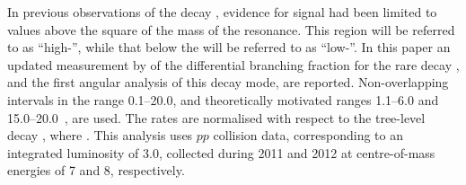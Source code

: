 In previous observations of the decay \decay{\Lb}{\Lz\mumu}
\cite{Aaltonen:2011qs,LHCB-PAPER-2013-025}, evidence for signal had
been limited to \qsq values above the square of the mass of the
\psitwos resonance. This region will be referred to as ``high-\qsq'',
while that below the \psitwos will be referred to as ``low-\qsq''.  In
this paper an updated measurement by \lhcb of the differential
branching fraction for the rare decay \decay{\Lb}{\Lz\mumu}, and the
first angular analysis of this decay mode, are reported.
Non-overlapping \qsq intervals in the range 0.1--20.0\gevgevcccc, and
theoretically motivated ranges 1.1--6.0 and 15.0--20.0\gevgevcccc ~\cite{Boer:2014kda,Beylich:2011aq,Beneke:2000wa}, are
used.  The rates are normalised with respect to the tree-level
\decay{\bquark}{\cquark\cquarkbar\squark} decay \decay{\Lb}{\jpsi\Lz},
where \decay{\jpsi}{\mumu}. This analysis uses $pp$ collision data,
corresponding to an integrated luminosity of 3.0\invfb, collected
during 2011 and 2012 at centre-of-mass energies of 7 and 8\tev,
respectively.



